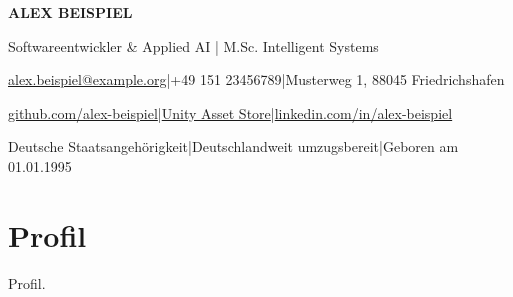 \documentclass[10pt,a4paper]{article}
\begin{document}
{\fontsize{24}{27}\selectfont\color{navy}\textbf{ALEX BEISPIEL}}\par\vspace{1pt}
{\large Softwareentwickler \& Applied AI | M.Sc. Intelligent Systems}\par\vspace{3pt}
{\small \href{mailto:alex.beispiel@example.org}{alex.beispiel@example.org}\enspace\textcolor{rule}{|}\enspace +49 151 23456789\enspace\textcolor{rule}{|}\enspace Musterweg 1, 88045 Friedrichshafen\par}
{\small \href{https://github.com/alex-beispiel}{github.com/alex-beispiel}\enspace\textcolor{rule}{|}\enspace \href{https://assetstore.unity.com/publishers/000000}{Unity Asset Store}\enspace\textcolor{rule}{|}\enspace \href{https://www.linkedin.com/in/alex-beispiel/}{linkedin.com/in/alex-beispiel}\par}
{\small Deutsche Staatsangehörigkeit\enspace\textcolor{rule}{|}\enspace Deutschlandweit umzugsbereit\enspace\textcolor{rule}{|}\enspace Geboren am 01.01.1995\par}
\vspace{3pt}{\color{navy}\rule{\linewidth}{1.2pt}}

\section{Profil}
Profil.\par
\end{document}
